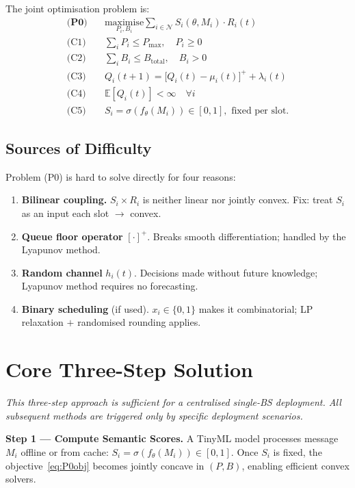 \documentclass[conference]{IEEEtran}
\begin{document}
The joint optimisation problem is:
\begin{align}
\textbf{(P0)}\quad &\underset{P_i,B_i}{\text{maximise}} \sum_{i \in \mathcal{N}} S_i(\theta, M_i) \cdot R_i(t) \label{eq:P0obj}\\
\text{(C1)}\quad & \sum_i P_i \le P_{\max},\quad P_i \ge 0 \label{eq:C1}\\
\text{(C2)}\quad & \sum_i B_i \le B_{\text{total}},\quad B_i > 0 \label{eq:C2}\\
\text{(C3)}\quad & Q_i(t{+}1) = \bigl[Q_i(t) - \mu_i(t)\bigr]^+ + \lambda_i(t) \label{eq:C3}\\
\text{(C4)}\quad & \mathbb{E}[Q_i(t)] < \infty \quad\forall i \label{eq:C4}\\
\text{(C5)}\quad & S_i = \sigma(f_\theta(M_i)) \in [0,1], \text{ fixed per slot.} \label{eq:C5}
\end{align}

\subsection{Sources of Difficulty}

Problem (P0) is hard to solve directly for four reasons:
\begin{enumerate}
\item \textbf{Bilinear coupling.} $S_i \times R_i$ is neither linear nor jointly convex. Fix: treat $S_i$ as an input each slot $\to$ convex.
\item \textbf{Queue floor operator} $[\cdot]^+$. Breaks smooth differentiation; handled by the Lyapunov method.
\item \textbf{Random channel} $h_i(t)$. Decisions made without future knowledge; Lyapunov method requires no forecasting.
\item \textbf{Binary scheduling} (if used). $x_i \in \{0,1\}$ makes it combinatorial; LP relaxation $+$ randomised rounding applies.
\end{enumerate}

\section{Core Three-Step Solution}
\label{sec:core}

\noindent\textit{This three-step approach is sufficient for a centralised single-BS deployment. All subsequent methods are triggered only by specific deployment scenarios.}

\textbf{Step 1 --- Compute Semantic Scores.}
A TinyML model processes message $M_i$ offline or from cache:
$S_i = \sigma(f_\theta(M_i)) \in [0,1]$.
Once $S_i$ is fixed, the objective~\eqref{eq:P0obj} becomes jointly concave in $(P,B)$, enabling efficient convex solvers.
\end{document}
